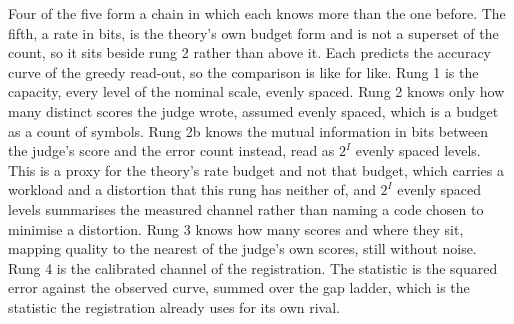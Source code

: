 \documentclass{article}
\theoremstyle{definition}
\theoremstyle{remark}
\begin{document}
Four of the five form a chain in which each knows more than the one before. The fifth, a rate in
bits, is the theory's own budget form and is not a superset of the count, so it sits beside rung 2
rather than above it. Each predicts the accuracy curve of the greedy read-out, so the comparison is
like for like. Rung 1 is the capacity, every level of the nominal scale, evenly spaced. Rung 2 knows
only how many distinct scores the judge wrote, assumed evenly spaced, which is a budget as a count of
symbols. Rung 2b knows the mutual information in bits between the judge's score and
the error count instead, read as $2^{I}$ evenly spaced levels. This is a proxy for the theory's rate
budget and not that budget, which carries a workload and a distortion that this rung has neither of,
and $2^{I}$ evenly spaced levels summarises the measured channel rather than naming a code chosen to
minimise a distortion. Rung 3
knows how many scores and where they sit, mapping quality to the nearest of the judge's own scores,
still without noise. Rung 4 is the calibrated channel of the registration. The statistic is the
squared error against the observed curve, summed over the gap ladder, which is the statistic the
registration already uses for its own rival.
\end{document}
